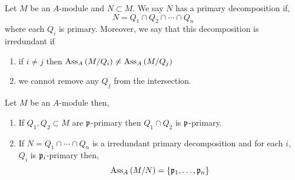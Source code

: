 \documentclass[12pt]{article}
\begin{document}
\begin{definition}
Let $M$ be an $A$-module and $N \subset M$. We say $N$ has a primary decomposition if,
\[ N = Q_1 \cap Q_2 \cap \cdots \cap Q_n \]
where each $Q_i$ is primary. Moreover, we say that this decomposition is irredundant if 
\begin{enumerate}
\item if $i \neq j$ then $\mathrm{Ass}_{A}\left( M / Q_i \right) \neq \mathrm{Ass}_{A}\left( M / Q_j \right)$ 

\item we cannot remove any $Q_j$ from the intersection.
\end{enumerate}
\end{definition}

\begin{lemma}
Let $M$ be an $A$-module then,
\begin{enumerate}
\item If $Q_1, Q_2 \subset M$ are $\mathfrak{p}$-primary then $Q_1 \cap Q_2$ is $\mathfrak{p}$-primary.  

\item If $N = Q_1 \cap \cdots \cap Q_n$ is a irredundant primary decomposition and for each $i$, $Q_i$ is $\mathfrak{p}_i$-primary then,
\[ \mathrm{Ass}_{A}\left( M / N \right) = \{ \mathfrak{p}_1, \dots, \mathfrak{p}_n \} \] 
\end{enumerate}
\end{lemma}
\end{document}
